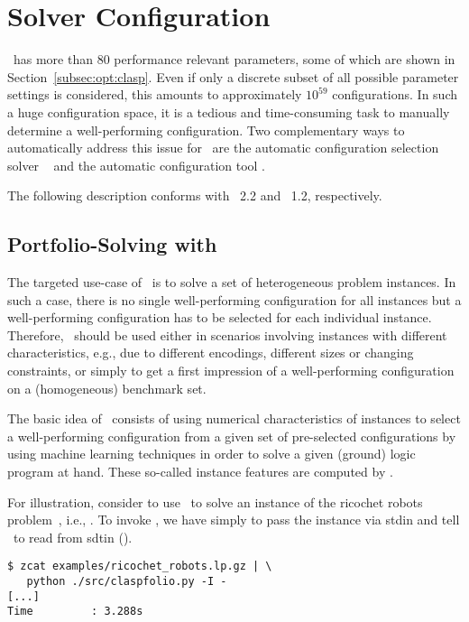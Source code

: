 
\section{Solver Configuration}
\label{sec:configuration}

\clasp\ has more than $80$ performance relevant parameters, some of which are shown in Section~\ref{subsec:opt:clasp}.
Even if only a discrete subset of all possible parameter settings is considered,
this amounts to approximately $10^{59}$ configurations.
In such a huge configuration space, 
it is a tedious and time-consuming task 
to manually determine a well-performing configuration.
Two complementary ways to automatically address this issue for \clasp\ are 
the automatic configuration selection solver \claspfolio~\cite{holisc14a} and 
the automatic configuration tool \piclasp.%

The following description conforms with \claspfolio~2.2 and \piclasp~1.2, respectively.

\subsection{Portfolio-Solving with \claspfolio}
\label{sec:claspfolio}

The targeted use-case of \claspfolio\ is to solve a set of heterogeneous problem instances.
In such a case,
there is no single well-performing configuration for all instances
but a well-performing configuration has to be selected for each individual instance.
Therefore, \claspfolio\ should be used either 
in scenarios involving instances with different characteristics, 
e.g., due to different encodings, different sizes or changing constraints,
or 
simply to get a first impression of a well-performing configuration on a (homogeneous) benchmark set. 

The basic idea of \claspfolio\ consists of using numerical characteristics of instances
to select a well-performing configuration from a given set of pre-selected configurations
by using machine learning techniques
in order to solve a given (ground) logic program at hand.
These so-called instance features are computed by \claspre. %

For illustration,
consider to use \claspfolio\ to solve an instance of the ricochet robots problem~\cite{gejokaobsascsc13a},
i.e., .
To invoke \claspfolio, we have simply to pass the instance via stdin 
and tell \claspfolio\ to read from sdtin ().
\begin{lstlisting}[numbers=none]
$ zcat examples/ricochet_robots.lp.gz | \
   python ./src/claspfolio.py -I -
[...]
Time         : 3.288s
\end{lstlisting}

